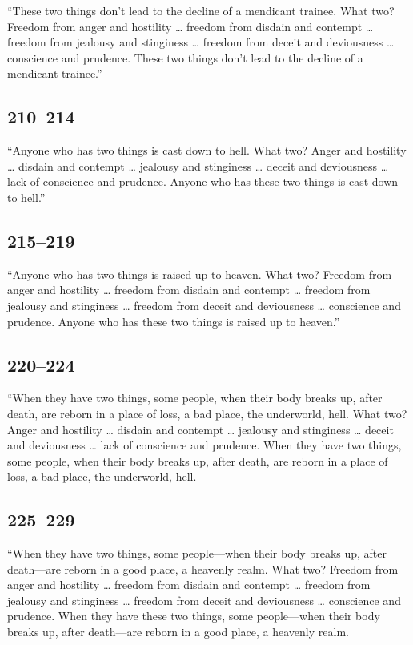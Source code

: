 \documentclass[12pt,openany]{book}%
\begin{document}
“These two things don’t lead to the decline of a mendicant trainee. What two? Freedom from anger and hostility … freedom from disdain and contempt … freedom from jealousy and stinginess … freedom from deceit and deviousness … conscience and prudence. These two things don’t lead to the decline of a mendicant trainee.” 

\subsection*{210–214 }

“Anyone who has two things is cast down to hell. What two? Anger and hostility … disdain and contempt … jealousy and stinginess … deceit and deviousness … lack of conscience and prudence. Anyone who has these two things is cast down to hell.” 

\subsection*{215–219 }

“Anyone who has two things is raised up to heaven. What two? Freedom from anger and hostility … freedom from disdain and contempt … freedom from jealousy and stinginess … freedom from deceit and deviousness … conscience and prudence. Anyone who has these two things is raised up to heaven.” 

\subsection*{220–224 }

“When they have two things, some people, when their body breaks up, after death, are reborn in a place of loss, a bad place, the underworld, hell. What two? Anger and hostility … disdain and contempt … jealousy and stinginess … deceit and deviousness … lack of conscience and prudence. When they have two things, some people, when their body breaks up, after death, are reborn in a place of loss, a bad place, the underworld, hell. 

\subsection*{225–229 }

“When they have two things, some people—when their body breaks up, after death—are reborn in a good place, a heavenly realm. What two? Freedom from anger and hostility … freedom from disdain and contempt … freedom from jealousy and stinginess … freedom from deceit and deviousness … conscience and prudence. When they have these two things, some people—when their body breaks up, after death—are reborn in a good place, a heavenly realm. 
\end{document}
